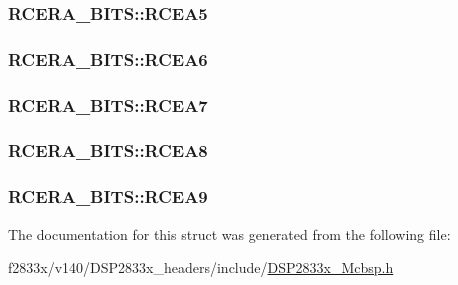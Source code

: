 \subsubsection[{R\+C\+E\+A5}]{ R\+C\+E\+R\+A\+\_\+\+B\+I\+T\+S\+::\+R\+C\+E\+A5}\label{struct_r_c_e_r_a___b_i_t_s_ad847206c4280c3eb29ab2cd233acf811}
\hypertarget{struct_r_c_e_r_a___b_i_t_s_ae30b73469cc5baefd55d28b8561fec67}{}
\subsubsection[{R\+C\+E\+A6}]{ R\+C\+E\+R\+A\+\_\+\+B\+I\+T\+S\+::\+R\+C\+E\+A6}\label{struct_r_c_e_r_a___b_i_t_s_ae30b73469cc5baefd55d28b8561fec67}
\hypertarget{struct_r_c_e_r_a___b_i_t_s_a83fd669b6208f4b2cef62d54c301e469}{}
\subsubsection[{R\+C\+E\+A7}]{ R\+C\+E\+R\+A\+\_\+\+B\+I\+T\+S\+::\+R\+C\+E\+A7}\label{struct_r_c_e_r_a___b_i_t_s_a83fd669b6208f4b2cef62d54c301e469}
\hypertarget{struct_r_c_e_r_a___b_i_t_s_a9983b31bef15ff4680ff77876706c8d3}{}
\subsubsection[{R\+C\+E\+A8}]{ R\+C\+E\+R\+A\+\_\+\+B\+I\+T\+S\+::\+R\+C\+E\+A8}\label{struct_r_c_e_r_a___b_i_t_s_a9983b31bef15ff4680ff77876706c8d3}
\hypertarget{struct_r_c_e_r_a___b_i_t_s_ab0752e0f8f5d4394bac173b6b2df1fdc}{}
\subsubsection[{R\+C\+E\+A9}]{ R\+C\+E\+R\+A\+\_\+\+B\+I\+T\+S\+::\+R\+C\+E\+A9}\label{struct_r_c_e_r_a___b_i_t_s_ab0752e0f8f5d4394bac173b6b2df1fdc}


The documentation for this struct was generated from the following file\+:\begin{DoxyCompactItemize}
\item 
f2833x/v140/\+D\+S\+P2833x\+\_\+headers/include/\hyperlink{_d_s_p2833x___mcbsp_8h}{D\+S\+P2833x\+\_\+\+Mcbsp.\+h}\end{DoxyCompactItemize}
